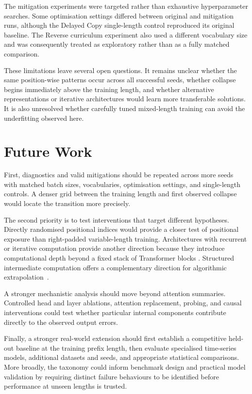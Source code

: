 \documentclass[
    author={Aanchala Ravindra Bhongade},
    supervisor={Dr. Fernando Moreno-Pino},
    degree={MSc},
    title={Length Generalisation in Transformer-Based Sequence Models: Failure Taxonomy and Mitigation Strategies},
    subtitle={},
    type={},
    year={2026}
]{dissertation}
\begin{document}
The mitigation experiments were targeted rather than exhaustive
hyperparameter searches. Some optimisation settings differed between original and mitigation runs, although the Delayed Copy single-length control reproduced its original baseline. The Reverse curriculum experiment also used a different vocabulary size and was consequently treated as exploratory rather than as a fully matched comparison.

These limitations leave several open questions. It remains unclear whether the same position-wise patterns occur across all successful seeds, whether collapse begins immediately above the training length, and whether alternative representations or iterative architectures would learn more transferable solutions. It is also unresolved whether carefully tuned mixed-length training can avoid the underfitting observed here.

\section{Future Work}

First, diagnostics and valid mitigations should be repeated across more seeds with matched batch sizes, vocabularies, optimisation settings, and single-length controls. A denser grid between the training length and first observed collapse would locate the transition more precisely.

The second priority is to test interventions that target different
hypotheses. Directly randomised positional indices would provide a closer test of positional exposure than right-padded variable-length training. Architectures with recurrent or iterative computation provide another direction because they introduce computational depth beyond a fixed stack of Transformer blocks \cite{dehghani2019universal,weiss2021thinking}. Structured intermediate computation offers a complementary direction for algorithmic extrapolation~\cite{anil2022exploring,hou2025turing}.

A stronger mechanistic analysis should move beyond attention summaries. Controlled head and layer ablations, attention replacement, probing, and causal interventions could test whether particular internal components contribute directly to the observed output errors.

Finally, a stronger real-world extension should first establish a competitive held-out baseline at the training prefix length, then evaluate specialised time-series models, additional datasets and seeds, and appropriate statistical comparisons. More broadly, the taxonomy could inform benchmark design and practical model validation by requiring distinct failure behaviours to be identified before performance at unseen lengths is trusted.
\end{document}
